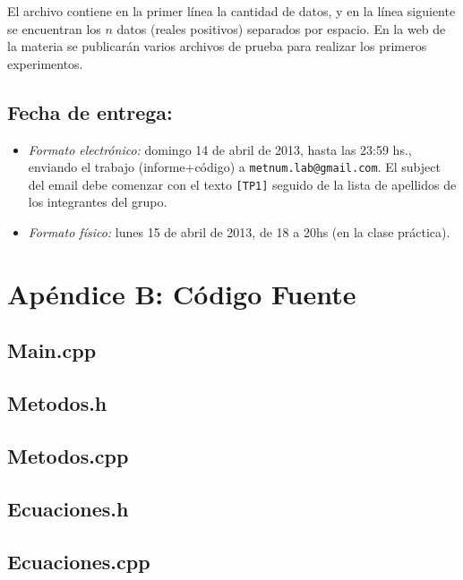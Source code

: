\documentclass[a4paper,10pt,twoside]{article}
\begin{document}
\vspace{0.5cm}

El archivo contiene en la primer l\'inea la cantidad de datos, y en la l\'inea siguiente se encuentran los $n$ datos (reales positivos) separados por espacio. En la web de la materia se publicar\'an varios archivos de prueba para realizar los primeros experimentos.

\subsection{Fecha de entrega:} 

\begin{itemize}
\item \textsl{Formato electr\'onico:} domingo 14 de abril de 2013, hasta las 23:59 hs., enviando el trabajo (informe+c\'odigo) a \texttt{metnum.lab@gmail.com}. El subject del email debe comenzar con el texto \verb|[TP1]| seguido de la lista de apellidos de los integrantes del grupo. 
\item \textsl{Formato f\'isico:} lunes 15 de abril de 2013, de 18 a 20hs (en la clase pr\'actica).
\end{itemize}




\section{Apéndice B: Código Fuente}
\subsection{Main.cpp}

\subsection{Metodos.h}

\subsection{Metodos.cpp}

\subsection{Ecuaciones.h}

\subsection{Ecuaciones.cpp}

\end{document}
